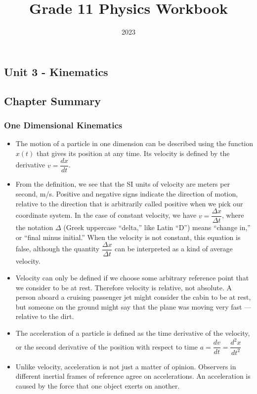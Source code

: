 \documentclass[12pt,addpoints]{exam}
\date{2023}
\begin{document}
	\title{Grade 11 Physics Workbook}
	\maketitle
	
	\begin{center}
		\section*{Unit 3 - Kinematics}
		\subsection*{Chapter Summary}
		\subsubsection*{One Dimensional Kinematics}
		\begin{itemize}
			\item The motion of a particle in one dimension can be described using the function $x(t)$ that gives its position at any time. Its velocity is defined by the derivative $v=\dfrac{dx}{dt}$. 
			\item From the definition, we see that the SI units of velocity are meters per second, m/s. Positive and negative signs indicate the direction of motion, relative to the direction that is arbitrarily called positive when we pick our coordinate system. In the case of constant velocity, we have $v=\dfrac{\Delta x}{\Delta t}$, where the notation $\Delta$ (Greek uppercase “delta,” like Latin “D”) means “change in,” or “final minus initial.” When the velocity is not constant, this equation is false, although the quantity $\dfrac{\Delta x}{\Delta t}$ can be interpreted as a kind of average velocity. 
			\item Velocity can only be defined if we choose some arbitrary reference point that we consider to be at rest. Therefore velocity is relative, not absolute. A person aboard a cruising passenger jet might consider the cabin to be at rest, but someone on the ground might say that the plane was moving very fast — relative to the dirt. 
			\item The acceleration of a particle is defined as the time derivative of the velocity, or the second derivative of the position with respect to time $a=\dfrac{dv}{dt}=\dfrac{d^2x}{dt^2}$
			\item Unlike velocity, acceleration is not just a matter of opinion. Observers in different inertial frames of reference agree on accelerations. An acceleration is caused by the force that one object exerts on another.
		\end{itemize}

\end{center}
\end{document}
